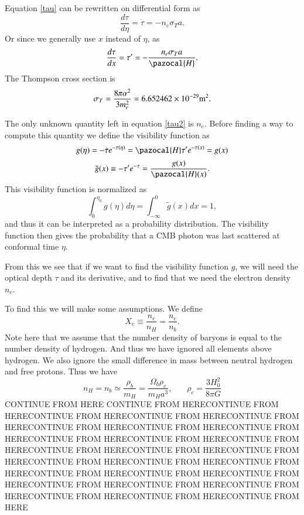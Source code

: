\documentclass{aa}   %
\begin{document}
Equation \ref{tau} can be rewritten on differential form as
\begin{equation}\label{tau2}
 \frac{d\tau}{d\eta}  = \dot{\tau}= - n_e\sigma_T a.
\end{equation}
Or since we generally use $x$ instead of $\eta$, as
\begin{equation}
 \frac{d\tau}{dx} = \tau' = -\frac{n_e\sigma_T a}{\pazocal{H}}.
\end{equation}
The Thompson cross section is
\begin{equation}
 \sigma_T =  \frac{8\pi\alpha^2}{3m_e^2} = 6.652462\times10^{-29} \textmd{m}^2.
\end{equation}


The only unknown quantity left in equation \ref{tau2} is $n_e$. 
Before finding a way to compute this quantity we define the visibility function as
\begin{equation}
 g(\eta) = -\dot{\tau}e^{-\tau(\eta)} = \pazocal{H}\tau'e^{-\tau(x)} = g(x)
\end{equation}
\begin{equation}
 \tilde{g}(x) \equiv -\tau'e^{-\tau}=\frac{g(x)}{\pazocal{H}(x)}. 
\end{equation}
This visibility function is normalized as
\begin{equation}
 \int_0^{\eta_0} g(\eta)d\eta = \int_{-\infty}^0 \tilde{g}(x)dx = 1,
\end{equation}
and thus it can be interpreted as a probability distribution. The visibility function then gives the probability that a CMB photon was last scattered at conformal time $\eta$.

From this we see that if we want to find the visibility function $g$, we will need the optical depth $\tau$ and its derivative, and to find that we need the electron density $n_e$.

To find this we will make some assumptions.
We define 
\begin{equation}
 X_e \equiv \frac{n_e}{n_H} = \frac{n_e}{n_b}.
\end{equation}
Note here that we assume that the number density of baryons is equal to the number density of hydrogen. And thus we have ignored all elements above hydrogen. We also ignore the small difference in mass between neutral hydrogen and free protons. Thus we have
\begin{equation}
 n_H = n_b \simeq \frac{\rho_b}{m_H} = \frac{\Omega_b \rho_c}{m_H a^3} ,~~~~~~~~ \rho_c  = \frac{3H_0^2}{8\pi G}
\end{equation}
CONTINUE FROM HERE
CONTINUE FROM HERECONTINUE FROM HERECONTINUE FROM HERECONTINUE FROM HERECONTINUE FROM HERECONTINUE FROM HERECONTINUE FROM HERECONTINUE FROM HERECONTINUE FROM HERECONTINUE FROM HERECONTINUE FROM HERECONTINUE FROM HERECONTINUE FROM HERECONTINUE FROM HERECONTINUE FROM HERECONTINUE FROM HERECONTINUE FROM HERECONTINUE FROM HERECONTINUE FROM HERECONTINUE FROM HERECONTINUE FROM HERECONTINUE FROM HERECONTINUE FROM HERECONTINUE FROM HERECONTINUE FROM HERECONTINUE FROM HERE
\end{document}
